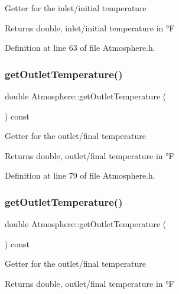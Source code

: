 Getter for the inlet/initial temperature \begin{DoxyReturn}{Returns}
double, inlet/initial temperature in °F 
\end{DoxyReturn}


Definition at line 63 of file Atmosphere.\+h.

\mbox{\label{class_atmosphere_a717e2dc78ebd13420f8f26707374dd3f}} 
\subsubsection{\texorpdfstring{get\+Outlet\+Temperature()}{getOutletTemperature()}\hspace{0.1cm}{\footnotesize\ttfamily [1/3]}}
{\footnotesize\ttfamily double Atmosphere\+::get\+Outlet\+Temperature (\begin{DoxyParamCaption}{ }\end{DoxyParamCaption}) const\hspace{0.3cm}{\ttfamily [inline]}}

Getter for the outlet/final temperature \begin{DoxyReturn}{Returns}
double, outlet/final temperature in °F 
\end{DoxyReturn}


Definition at line 79 of file Atmosphere.\+h.

\mbox{\label{class_atmosphere_a717e2dc78ebd13420f8f26707374dd3f}} 
\subsubsection{\texorpdfstring{get\+Outlet\+Temperature()}{getOutletTemperature()}\hspace{0.1cm}{\footnotesize\ttfamily [2/3]}}
{\footnotesize\ttfamily double Atmosphere\+::get\+Outlet\+Temperature (\begin{DoxyParamCaption}{ }\end{DoxyParamCaption}) const\hspace{0.3cm}{\ttfamily [inline]}}

Getter for the outlet/final temperature \begin{DoxyReturn}{Returns}
double, outlet/final temperature in °F 
\end{DoxyReturn}


